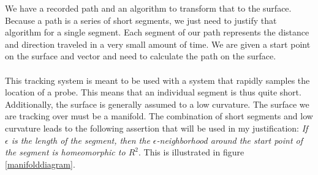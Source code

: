 \documentclass[conference]{acmsiggraph}
\begin{document}
We have a recorded path and an algorithm to transform that to the surface. Because a path is a series of short segments, we just need to justify that algorithm for a single segment. Each segment of our path represents the distance and direction traveled in a very small amount of time. We are given a start point on the surface and vector and need to calculate the path on the surface. \\
\\
This tracking system is meant to be used with a system that rapidly samples the location of a probe. This means that an individual segment is thus quite short. Additionally, the surface is generally assumed to a low curvature. The surface we are tracking over must be a manifold. The combination of short segments and low curvature leads to the following assertion that will be used in my justification: {\it If $\epsilon$ is the length of the segment, then the $\epsilon$-neighborhood around the start point of the segment is homeomorphic to $R^2$}. This is illustrated in figure \ref{manifolddiagram}.\\
\\
\end{document}

